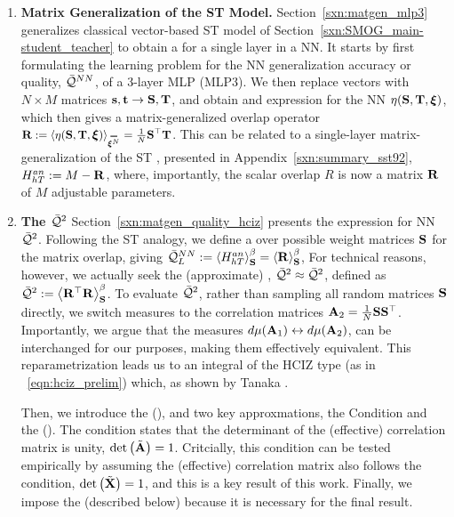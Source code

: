 
\begin{enumerate}[label=5.\arabic*]
\item
\textbf{Matrix Generalization of the ST Model.}
Section~\ref{sxn:matgen_mlp3} generalizes
classical \STATMECH vector-based ST model of Section~\ref{sxn:SMOG_main-student_teacher}
to obtain a \LayerQuality for a single layer in a NN.
It starts by first formulating the learning problem for
the  NN generalization accuracy or quality, $\bar{\mathcal{Q}}^{NN}$,
of a  3-layer MLP (MLP3).
We then replace vectors with $N \times M$ matrices ${\mathbf{s}},{\mathbf{t}}\rightarrow{\mathbf{S}},{\mathbf{T}}$,
and obtain and expression for the NN \SelfOverlap $\eta({\mathbf{S}},{\mathbf{T}},\boldsymbol{\xi})$,
which then gives a matrix-generalized overlap operator
$\OVERLAP:=\langle\ETA(\SMAT,\TMAT,\XI)\rangle_{\AVGNDXI}=\tfrac{1}{N}\SMAT^{\top}\TMAT$.
This can be related to a single-layer matrix-generalization of the ST \AnnealedHamiltonian, 
presented in Appendix~\ref{sxn:summary_sst92}, $H^{an}_{hT}:=M-\mathbf{R}$,
where, importantly, the scalar overlap $R$ is now a matrix $\mathbf{R}$ of $M$ adjustable parameters.

\item
\textbf{The \LayerQualitySquared $\bar{\mathcal{Q}}^{2}$}
Section~\ref{sxn:matgen_quality_hciz} presents the expression for NN \LayerQualitySquared $\bar{\mathcal{Q}}^{2}$.
Following the ST analogy, we define a \ThermalAverage over possible \Student weight matrices ${\mathbf{S}}$
for the matrix overlap, giving $\bar{\mathcal{Q}}^{NN}_{L}:=\left\langle H^{an}_{hT} \right\rangle_{\mathbf S}^{\beta} =\left\langle \mathbf{R} \right\rangle_{\mathbf S}^{\beta}$,
For technical reasons, however, we actually seek the (approximate)  \LayerQualitySquared, $\bar{\mathcal{Q}}^{2}\approx\bar{\mathcal{Q}}^{2}$,
defined as $\bar{\mathcal{Q}}^{2}:=\left\langle {\mathbf{R}}^{\top}\mathbf{R} \right\rangle_{\mathbf S}^{\beta}$.
To evaluate $\bar{\mathcal{Q}}^{2}$, rather than sampling all random \Student matrices ${\mathbf{S}}$ directly,
we switch measures to the \Student correlation matrices 
$\mathbf{A}_{2} = \tfrac{1}{N}{\mathbf{S}}{\mathbf{S}}^{\top}$.
Importantly, we argue that the measures $d\mu(\mathbf{A}_{1})\leftrightarrow d\mu(\mathbf{A}_{2})$,
can be interchanged for our purposes, making them effectively equivalent.
This reparametrization leads us to an integral of the HCIZ type (as in \EQN~\ref{eqn:hciz_prelim})
which, as shown by Tanaka \cite{Tanaka2007, Tanaka2008}.

Then, we introduce the \EffectiveCorrelationSpace (\ECS), and two key approxmations,
the \TRACELOG Condition and the \IndependentFluctuationApproximation (\IFA).
The \TRACELOG condition states that the determinant of the (effective) \Student correlation matrix is unity, $\mbox{}{\text{det}}\left(\tilde{\mathbf{A}}\right)=1$.
Critcially, this condition can be tested empirically by assuming the (effective) \Teacher correlation matrix
also follows the \TRACELOG condition, $\mbox{}{\text{det}}\left(\tilde{\mathbf{X}}\right)=1$, and this is a key result of this work.
Finally, we impose the \IFA (described below) because it is necessary for the final result.


\end{enumerate}
